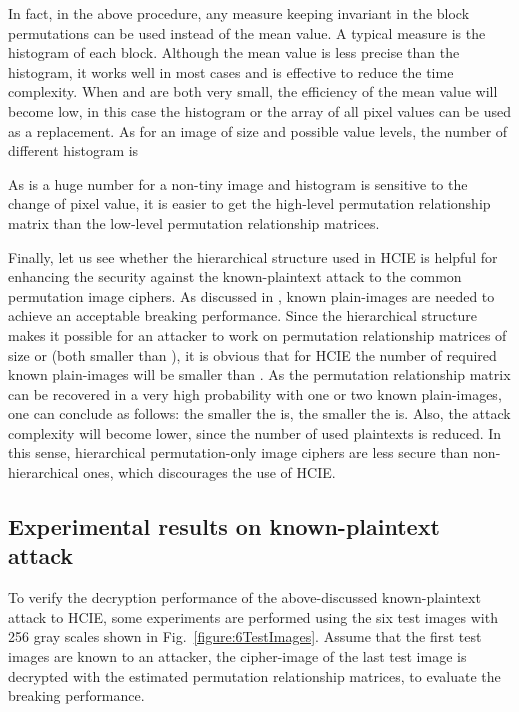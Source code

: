 \documentclass[final,3p,times,twocolumn]{elsarticle}
\begin{document}
In fact, in the above procedure, any measure keeping invariant in
the block permutations can be used instead of the mean value. A
typical measure is the histogram of each  block.
Although the mean value is less precise than the histogram, it
works well in most cases and is effective to reduce the time
complexity. When  and  are both very small, the
efficiency of the mean value will become low, in this case the histogram or
the array of all pixel values can be used as a replacement.
As for an image of size  and  possible value levels,
the number of different histogram is

As  is a huge number for a non-tiny image and histogram is sensitive to the change of pixel value, it is easier to get the high-level
permutation relationship matrix  than the low-level permutation relationship matrices.

Finally, let us see whether the hierarchical structure used in
HCIE is helpful for enhancing the security against the
known-plaintext attack to the common permutation image ciphers. As
discussed in \cite[Sec.~3.1]{Li:Permutation:SPIC2008},  known
plain-images are needed to achieve an acceptable breaking
performance. Since the hierarchical structure makes it possible
for an attacker to work on permutation relationship matrices of size  or  (both smaller than
), it is obvious that for HCIE the number of required
known plain-images will be smaller than
. As the permutation relationship matrix 
can be recovered in a very high probability with one or two known plain-images, one
can conclude as follows: the smaller the  is, the smaller the  is. Also, the attack complexity will
become lower, since the number of used plaintexts is reduced. In this sense, hierarchical permutation-only image
ciphers are less secure than non-hierarchical ones, which discourages the use of HCIE.

\subsection{Experimental results on known-plaintext attack}
\label{section:Experiments}

To verify the decryption performance of the above-discussed
known-plaintext attack to HCIE, some
experiments are performed using the six  test
images with 256 gray scales shown in Fig.~\ref{figure:6TestImages}. Assume that the first  test
images are known to an attacker, the cipher-image of the last test
image is decrypted with the estimated permutation relationship matrices, to evaluate
the breaking performance.
\end{document}
